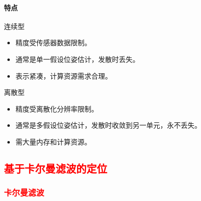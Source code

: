 \documentclass[
12pt, %
a4paper, 
oneside, %
]{scrartcl}
\begin{document}
\paragraph{特点}
\begin{itemize}
\begin{minipage}{0.5\textwidth}
\item 连续型
\begin{itemize}
\item 精度受传感器数据限制。
\item 通常是单一假设位姿估计，发散时丢失。
\item 表示紧凑，计算资源需求合理。
\end{itemize}
\end{minipage}
\begin{minipage}{0.5\textwidth}
\item 离散型
\begin{itemize}
\item 精度受离散化分辨率限制。
\item 通常是多假设位姿估计，发散时收敛到另一单元，永不丢失。
\item 需大量内存和计算资源。
\end{itemize}
\end{minipage}
\end{itemize}
\subsection[基于卡尔曼滤波的定位]{\textcolor{red}{基于卡尔曼滤波的定位}}
\subsubsection[卡尔曼滤波]{\textcolor{red}{卡尔曼滤波}}
\end{document}
